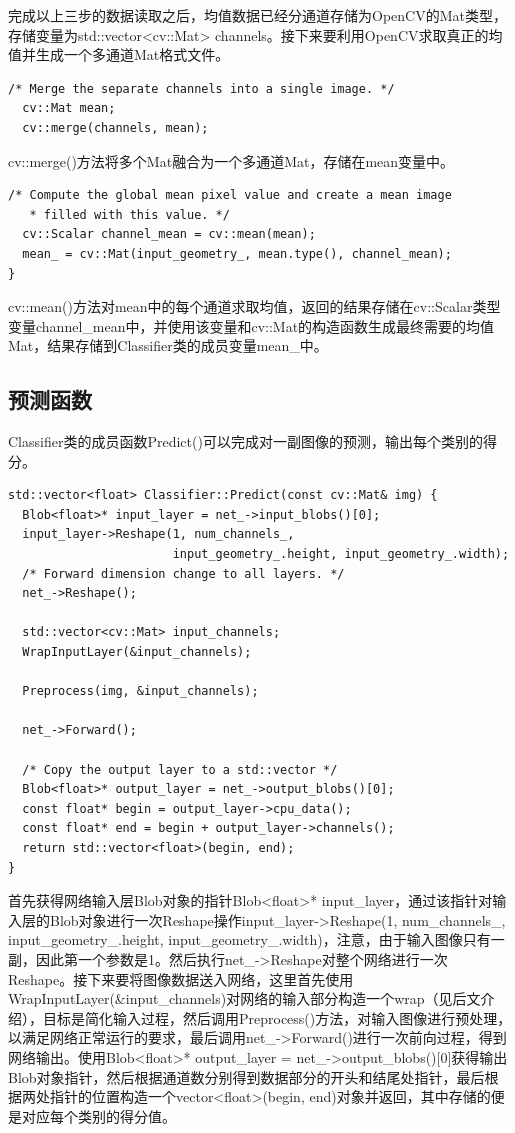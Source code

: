 完成以上三步的数据读取之后，均值数据已经分通道存储为OpenCV的Mat类型，存储变量为std::vector<cv::Mat> channels。接下来要利用OpenCV求取真正的均值并生成一个多通道Mat格式文件。
\begin{verbatim}
/* Merge the separate channels into a single image. */
  cv::Mat mean;
  cv::merge(channels, mean);
\end{verbatim}
cv::merge()方法将多个Mat融合为一个多通道Mat，存储在mean变量中。
\begin{verbatim}
/* Compute the global mean pixel value and create a mean image
   * filled with this value. */
  cv::Scalar channel_mean = cv::mean(mean);
  mean_ = cv::Mat(input_geometry_, mean.type(), channel_mean);
}
\end{verbatim}
cv::mean()方法对mean中的每个通道求取均值，返回的结果存储在cv::Scalar类型变量channel\_mean中，并使用该变量和cv::Mat的构造函数生成最终需要的均值Mat，结果存储到Classifier类的成员变量mean\_中。

\subsection{预测函数}
Classifier类的成员函数Predict()可以完成对一副图像的预测，输出每个类别的得分。
\begin{verbatim}
std::vector<float> Classifier::Predict(const cv::Mat& img) {
  Blob<float>* input_layer = net_->input_blobs()[0];
  input_layer->Reshape(1, num_channels_,
                       input_geometry_.height, input_geometry_.width);
  /* Forward dimension change to all layers. */
  net_->Reshape();

  std::vector<cv::Mat> input_channels;
  WrapInputLayer(&input_channels);

  Preprocess(img, &input_channels);

  net_->Forward();

  /* Copy the output layer to a std::vector */
  Blob<float>* output_layer = net_->output_blobs()[0];
  const float* begin = output_layer->cpu_data();
  const float* end = begin + output_layer->channels();
  return std::vector<float>(begin, end);
}
\end{verbatim}
首先获得网络输入层Blob对象的指针Blob<float>* input\_layer，通过该指针对输入层的Blob对象进行一次Reshape操作input\_layer->Reshape(1, num\_channels\_, input\_geometry\_.height, input\_geometry\_.width)，注意，由于输入图像只有一副，因此第一个参数是1。然后执行net\_->Reshape对整个网络进行一次Reshape。接下来要将图像数据送入网络，这里首先使用WrapInputLayer(\&input\_channels)对网络的输入部分构造一个wrap（见后文介绍），目标是简化输入过程，然后调用Preprocess()方法，对输入图像进行预处理，以满足网络正常运行的要求，最后调用net\_->Forward()进行一次前向过程，得到网络输出。使用Blob<float>* output\_layer = net\_->output\_blobs()[0]获得输出Blob对象指针，然后根据通道数分别得到数据部分的开头和结尾处指针，最后根据两处指针的位置构造一个vector<float>(begin, end)对象并返回，其中存储的便是对应每个类别的得分值。

